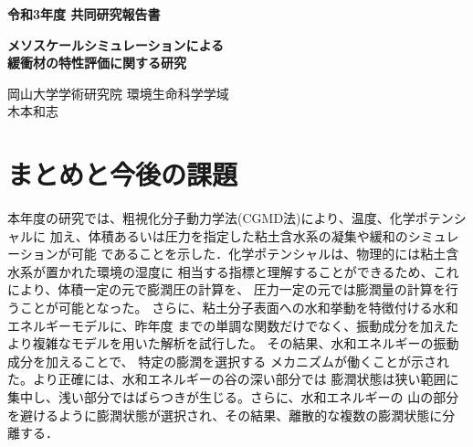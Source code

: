 ﻿\documentclass[11pt,a4j]{jarticle}
\newlength{\minitwocolumn}
\begin{document}
\newcommand{\fat}[1]{\mbox{\boldmath $#1$}}
\newcommand{\D}{\partial}
\newcommand{\w}{\omega}
\newcommand{\ga}{\alpha}
\newcommand{\gb}{\beta}
\newcommand{\gx}{\xi}
\newcommand{\gz}{\zeta}
\newcommand{\vhat}[1]{\hat{\fat{#1}}}
\newcommand{\spc}{\vspace{0.7\baselineskip}}
\newcommand{\halfspc}{\vspace{0.3\baselineskip}}

\newcommand{\twofig}[2]
 {
   \begin{figure}[h]
     \begin{minipage}[t]{\minitwocolumn}
         \begin{center}   #1
         \end{center}
     \end{minipage}
         \hspace{\columnsep}
     \begin{minipage}[t]{\minitwocolumn}
         \begin{center} #2
         \end{center}
     \end{minipage}
   \end{figure}
 }
\begin{center}
{\Large \bf 令和3年度 共同研究報告書}
\end{center}
\vspace{2mm}
\begin{center}
{\LARGE \bf 
メソスケールシミュレーションによる\\緩衝材の特性評価に関する研究} 
\end{center}
\begin{center}
岡山大学学術研究院 環境生命科学学域\\
木本和志
\end{center}
\vspace{10mm}
	


%
\section{まとめと今後の課題}
\hspace{\parindent}
本年度の研究では、粗視化分子動力学法(CGMD法)により、温度、化学ポテンシャルに
加え、体積あるいは圧力を指定した粘土含水系の凝集や緩和のシミュレーションが可能
であることを示した．化学ポテンシャルは、物理的には粘土含水系が置かれた環境の湿度に
相当する指標と理解することができるため、これにより、体積一定の元で膨潤圧の計算を、
圧力一定の元では膨潤量の計算を行うことが可能となった。
さらに、粘土分子表面への水和挙動を特徴付ける水和エネルギーモデルに、昨年度
までの単調な関数だけでなく、振動成分を加えたより複雑なモデルを用いた解析を試行した。
その結果、水和エネルギーの振動成分を加えることで、 特定の膨潤を選択する
メカニズムが働くことが示された。より正確には、水和エネルギーの谷の深い部分では
膨潤状態は狭い範囲に集中し、浅い部分ではばらつきが生じる。さらに、水和エネルギーの
山の部分を避けるように膨潤状態が選択され、その結果、離散的な複数の膨潤状態に分離する．
\end{document}
